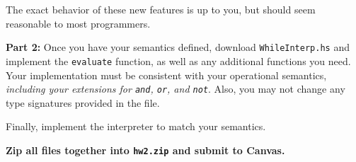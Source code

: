 \documentclass{article}
\begin{document}
The exact behavior of these new features is up to you,
but should seem reasonable to most programmers.

\bigskip
\noindent
{\bf Part 2:}
Once you have your semantics defined,
download {\tt WhileInterp.hs} and implement the {\tt evaluate} function,
as well as any additional functions you need.
Your implementation must be consistent with your operational semantics,
{\it including your extensions for {\tt and}, {\tt or}, and {\tt not}}.
Also, you may not change any type signatures provided in the file.

Finally, implement the interpreter to match your semantics.

\bigskip
\noindent
{\bf Zip all files together into {\tt hw2.zip} and submit to Canvas.}





%
\end{document}

